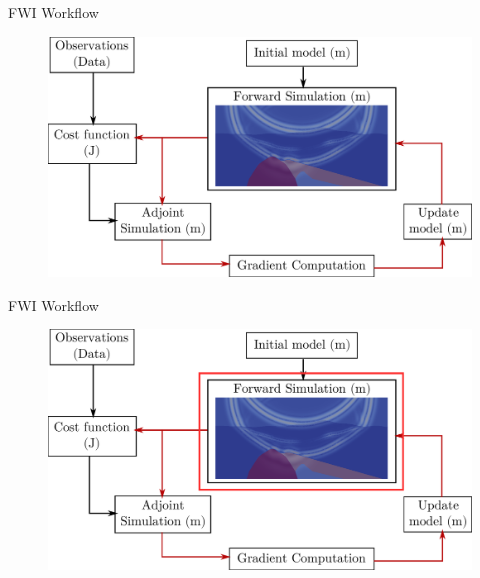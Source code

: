 \begin{frame}[noframenumbering]{FWI Workflow}
\begin{figure}
  \includegraphics[scale=0.31]{fwi_test.pdf}
\end{figure}
\end{frame}

\begin{frame}[noframenumbering]{FWI Workflow}
\begin{figure}
  \includegraphics[scale=0.31]{fwi_test3.pdf}
\end{figure}
\end{frame}



